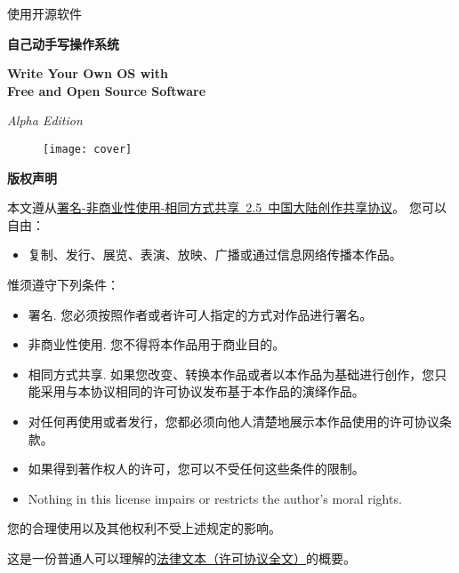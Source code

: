 \begin{center}
\Huge 使用开源软件

\bf\fontsize{48}{52}\selectfont 自己动手写操作系统

\bf\sc\Huge Write Your Own OS with\\ Free and Open Source Software

\it\LARGE Alpha Edition
\end{center}

\vskip 1cm
\begin{figure}[htbp]
 \centering
\texttt{[image: cover]}
\end{figure}

\noindent{}
\noindent{}
\clearpage

\begin{lined}{\textwidth}\vspace{2ex}
\begin{center}
\bf\Large 版权声明
\end{center}
\vspace{2ex}
\end{lined}

\normalsize
本文遵从\href{http://creativecommons.org/licenses/by-nc-sa/2.5/cn/}{署名-非商业性使用-相同方式共享~2.5~中国大陆创作共享协议}。
\vskip 1cm
\noindent
\large 您可以自由：
\normalsize
\begin{itemize}
\item 复制、发行、展览、表演、放映、广播或通过信息网络传播本作品。
\end{itemize}

\noindent
\large 惟须遵守下列条件：
\normalsize
\begin{itemize}
\item{署名.} 您必须按照作者或者许可人指定的方式对作品进行署名。
\item{非商业性使用.} 您不得将本作品用于商业目的。
\item{相同方式共享.} 如果您改变、转换本作品或者以本作品为基础进行创作，您只能采用与本协议相同的许可协议发布基于本作品的演绎作品。
\item 对任何再使用或者发行，您都必须向他人清楚地展示本作品使用的许可协议条款。
\item 如果得到著作权人的许可，您可以不受任何这些条件的限制。
\item Nothing in this license impairs or restricts the author's moral rights.
\end{itemize}
\vskip 1cm
\normalsize
\begin{center}
您的合理使用以及其他权利不受上述规定的影响。

这是一份普通人可以理解的\href{http://creativecommons.org/licenses/by-nc-sa/2.5/cn/legalcode}{法律文本（许可协议全文）}的概要。 
\end{center}


